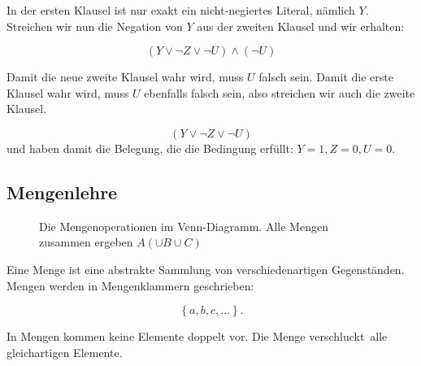 \documentclass{scrartcl}
\begin{document}
In der ersten Klausel ist nur exakt ein nicht-negiertes Literal, nämlich $Y$. Streichen wir nun die Negation von $Y$ aus der zweiten
Klausel und wir erhalten:

\begin{equation}
	(Y \lor \lnot Z \lor \lnot U) \wedge (\lnot U)
\end{equation}

Damit die neue zweite Klausel wahr wird, muss $U$ falsch sein. Damit die erste Klausel wahr wird, muss $U$ ebenfalls falsch sein,
also streichen wir auch die zweite Klausel.

\begin{equation}
	(Y \lor \lnot Z \lor \lnot U)
\end{equation}
und haben damit die Belegung, die die Bedingung erfüllt: $Y = 1, Z = 0, U = 0$.


\subsection{Mengenlehre}

\begin{figure}[h!]
	\centering
	\caption{Die Mengenoperationen im Venn-Diagramm. Alle Mengen zusammen ergeben $A (\cup B \cup C)$}
\end{figure}  



Eine Menge ist eine abstrakte Sammlung von verschiedenartigen Gegenständen. Mengen werden in Mengenklammern geschrieben:

\begin{equation}
	\left\{a, b, c, \dots\right\}.
\end{equation}

In Mengen kommen keine Elemente doppelt vor. Die Menge \frq verschluckt\flq\ alle gleichartigen Elemente.
\end{document}
